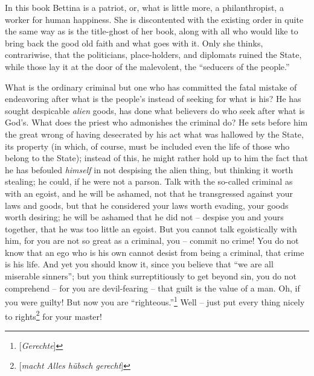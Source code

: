 In this book Bettina is a patriot, or, what is little more, a philanthropist, 
a worker for human happiness. She is discontented with the existing order in 
quite the same way as is the title-ghost of her book, along with all who would 
like to bring back the good old faith and what goes with it. Only she thinks, 
contrariwise, that the politicians, place-holders, and diplomats ruined the 
State, while those lay it at the door of the malevolent, the ``seducers of 
the people.''

What is the ordinary criminal but one who has committed the fatal mistake of 
endeavoring after what is the people's instead of seeking for what is his? He 
has sought despicable \textit{alien} goods, has done what believers do who 
seek after what is God's. What does the priest who admonishes the criminal do? 
He sets before him the great wrong of having desecrated by his act what was 
hallowed by the State, its property (in which, of course, must be included 
even the life of those who belong to the State); instead of this, he might 
rather hold up to him the fact that he has befouled \textit{himself} in not 
despising the alien thing, but thinking it worth stealing; he could, if he 
were not a parson. Talk with the so-called criminal as with an egoist, and he 
will be ashamed, not that he transgressed against your laws and goods, but 
that he considered your laws worth evading, your goods worth desiring; he will 
be ashamed that he did not -- despise you and yours together, that he was too 
little an egoist. But you cannot talk egoistically with him, for you are not 
so great as a criminal, you -- commit no crime! You do not know that an ego 
who is his own cannot desist from being a criminal, that crime is his life. 
And yet you should know it, since you believe that ``we are all miserable 
sinners''; but you think surreptitiously to get beyond sin, you do not 
comprehend -- for you are devil-fearing -- that guilt is the value of a man. 
Oh, if you were guilty! But now you are 
``righteous.''\footnote{[\textit{Gerechte}]} Well -- just put every thing 
nicely to rights\footnote{[\textit{macht Alles h\"ubsch gerecht}]} for your 
master!

